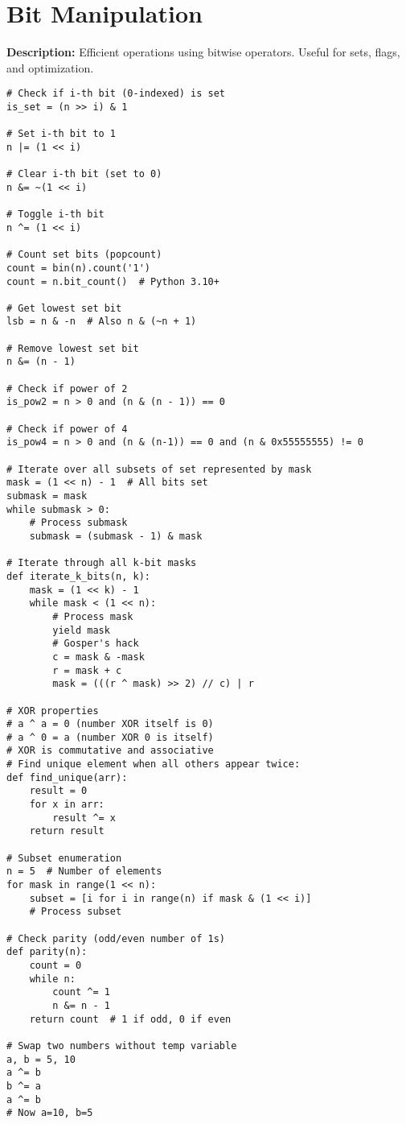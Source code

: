 \section{Bit Manipulation}

\textbf{Description:} Efficient operations using bitwise operators. Useful for sets, flags, and optimization.

\begin{lstlisting}
# Check if i-th bit (0-indexed) is set
is_set = (n >> i) & 1

# Set i-th bit to 1
n |= (1 << i)

# Clear i-th bit (set to 0)
n &= ~(1 << i)

# Toggle i-th bit
n ^= (1 << i)

# Count set bits (popcount)
count = bin(n).count('1')
count = n.bit_count()  # Python 3.10+

# Get lowest set bit
lsb = n & -n  # Also n & (~n + 1)

# Remove lowest set bit
n &= (n - 1)

# Check if power of 2
is_pow2 = n > 0 and (n & (n - 1)) == 0

# Check if power of 4
is_pow4 = n > 0 and (n & (n-1)) == 0 and (n & 0x55555555) != 0

# Iterate over all subsets of set represented by mask
mask = (1 << n) - 1  # All bits set
submask = mask
while submask > 0:
    # Process submask
    submask = (submask - 1) & mask

# Iterate through all k-bit masks
def iterate_k_bits(n, k):
    mask = (1 << k) - 1
    while mask < (1 << n):
        # Process mask
        yield mask
        # Gosper's hack
        c = mask & -mask
        r = mask + c
        mask = (((r ^ mask) >> 2) // c) | r

# XOR properties
# a ^ a = 0 (number XOR itself is 0)
# a ^ 0 = a (number XOR 0 is itself)
# XOR is commutative and associative
# Find unique element when all others appear twice:
def find_unique(arr):
    result = 0
    for x in arr:
        result ^= x
    return result

# Subset enumeration
n = 5  # Number of elements
for mask in range(1 << n):
    subset = [i for i in range(n) if mask & (1 << i)]
    # Process subset

# Check parity (odd/even number of 1s)
def parity(n):
    count = 0
    while n:
        count ^= 1
        n &= n - 1
    return count  # 1 if odd, 0 if even

# Swap two numbers without temp variable
a, b = 5, 10
a ^= b
b ^= a
a ^= b
# Now a=10, b=5
\end{lstlisting}
